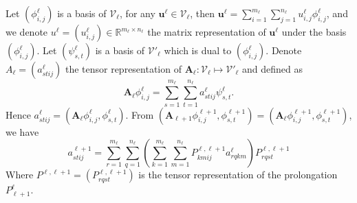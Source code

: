 Let $(\phi^{\ell}_{i,j})$ is a basis of $\mathcal V_\ell$, for any $\mathbf u^\ell \in \mathcal V_\ell$, then $\mathbf u^{\ell}=\sum\limits_{i=1}^{m_{\ell}}\sum\limits_{j=1}^{n_{\ell}}u_{i,j}^{\ell}\phi^{\ell}_{i,j}$, and we denote $u^\ell=(u_{i,j}^{\ell})\in  \mathbb R^{m_{\ell}\times n_{\ell} }$ the matrix representation of $\mathbf u^\ell$ under the basis $(\phi^{\ell}_{i,j})$.
Let $(\psi^{\ell}_{s,t})$ is a basis of $\mathcal V'_\ell$ which is dual to $(\phi^{\ell}_{i,j})$. Denote $A_\ell=(a_{stij}^{\ell})$ the tensor representation of $\mathbf A_\ell: \mathcal V_\ell\mapsto \mathcal V'_\ell $ and defined as 
$$
\mathbf A_\ell \phi^\ell_{i,j}=\sum\limits_{s=1}^{m_{\ell}}\sum\limits_{t=1}^{n_{\ell}}a_{stij}^{\ell}\psi^\ell_{s,t}.
$$
Hence $a_{stij}^{\ell}=(\mathbf A_\ell \phi^\ell_{i,j}, \phi^\ell_{s,t})$. From $(\mathbf A_{\ell+1}\phi^{\ell+1}_{i,j}, \phi^{\ell+1}_{s,t})=(\mathbf A_\ell\phi^{\ell+1}_{i,j}, \phi^{\ell+1}_{s,t})$, we have
$$
a_{stij}^{\ell+1}=\sum_{r=1}^{m_\ell}\sum_{q=1}^{n_\ell}\left(\sum_{k=1}^{m_\ell}\sum_{m=1}^{n_\ell} P_{kmij}^{\ell,{\ell+1}} a_{rqkm}^\ell\right)P_{rqst}^{\ell,{\ell+1}} 
$$ 
Where $P^{\ell,{\ell+1}}=(P_{rqst}^{\ell,{\ell+1}})$ is the tensor representation of the prolongation $P_{\ell+1}^{\ell}$.


